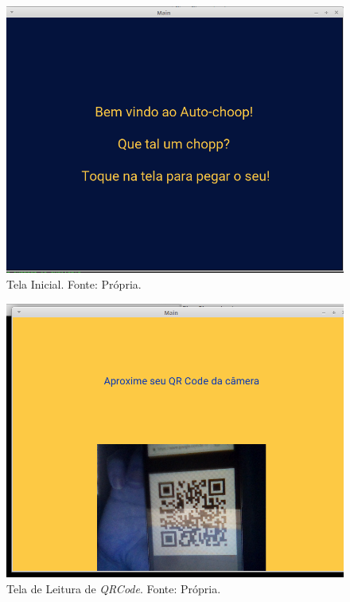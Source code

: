         \begin{figure}[H]
            \centering
            \includegraphics[scale= 0.4]{figuras/home-screen.png}
            \caption{Tela Inicial. Fonte: Própria.}
            \label{home-screen}
        \end{figure}

        \begin{figure}[H]
            \centering
            \includegraphics[scale= 0.4]{figuras/leitor-qrcode.png}
            \caption{Tela de Leitura de \textit{QRCode}. Fonte: Própria.}
            \label{leitor-qrcode}
        \end{figure}

